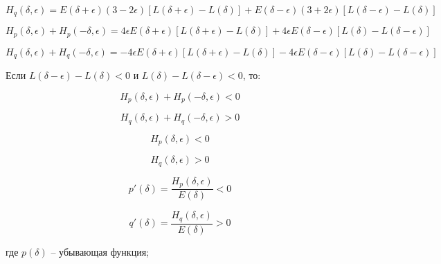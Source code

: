 \begin{equation}
\label{eq:equation86}
H_{q}(\delta, \epsilon) = E(\delta + \epsilon)(3 - 2 \epsilon) [L (\delta + \epsilon) - L(\delta)] + E(\delta - \epsilon)(3 + 2\epsilon)[L(\delta - \epsilon) - L(\delta)]
\end{equation}

\begin{equation}
\label{eq:equation87}
H_{p}(\delta, \epsilon) + H_{p}(- \delta, \epsilon) = 4 \epsilon E (\delta + \epsilon) [L(\delta + \epsilon) - L(\delta)] + 4 \epsilon E (\delta - \epsilon)[L(\delta) - L (\delta - \epsilon)] 
\end{equation}

\begin{equation}
\label{eq:equation88}
H_{q}(\delta, \epsilon) + H_{q}(- \delta, \epsilon) = - 4 \epsilon E (\delta + \epsilon) [L(\delta + \epsilon) - L(\delta)] - 4 \epsilon E (\delta - \epsilon)[L(\delta) - L (\delta - \epsilon)]  
\end{equation}

Если $L (\delta - \epsilon) - L(\delta) < 0$ и $L(\delta) - L(\delta - \epsilon) < 0$, то:

\begin{equation}
\label{eq:equation89}
H_{p}(\delta, \epsilon) + H_{p}(- \delta, \epsilon) < 0  
\end{equation}

\begin{equation}
\label{eq:equation90}
H_{q}(\delta, \epsilon) + H_{q}(- \delta, \epsilon) > 0  
\end{equation}

\begin{equation}
\label{eq:equation91}
H_{p}(\delta, \epsilon) < 0
\end{equation}

\begin{equation}
\label{eq:equation92}
H_{q}(\delta, \epsilon) > 0
\end{equation}

\begin{equation}
\label{eq:equation93}
p'(\delta) = \frac{H_{p}(\delta, \epsilon)}{E(\delta)} < 0
\end{equation}

\begin{equation}
\label{eq:equation94}
q'(\delta) = \frac{H_{q}(\delta, \epsilon)}{E(\delta)} > 0
\end{equation}

где $p(\delta)$ -- убывающая функция;


